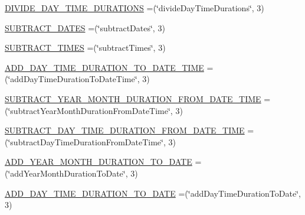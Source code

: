 \begin{DoxyCompactItemize}
\item 
\hyperlink{enumorg_1_1semanticweb_1_1owlapi_1_1vocab_1_1_s_w_r_l_built_ins_vocabulary_a63a05090a4989d42fb0eba21886a5f09}{D\-I\-V\-I\-D\-E\-\_\-\-D\-A\-Y\-\_\-\-T\-I\-M\-E\-\_\-\-D\-U\-R\-A\-T\-I\-O\-N\-S} =(\char`\"{}divide\-Day\-Time\-Durations\char`\"{}, 3)
\item 
\hyperlink{enumorg_1_1semanticweb_1_1owlapi_1_1vocab_1_1_s_w_r_l_built_ins_vocabulary_a159b1927f00998bffdca289368b8badb}{S\-U\-B\-T\-R\-A\-C\-T\-\_\-\-D\-A\-T\-E\-S} =(\char`\"{}subtract\-Dates\char`\"{}, 3)
\item 
\hyperlink{enumorg_1_1semanticweb_1_1owlapi_1_1vocab_1_1_s_w_r_l_built_ins_vocabulary_af9557d553614c0a341302fb24b919940}{S\-U\-B\-T\-R\-A\-C\-T\-\_\-\-T\-I\-M\-E\-S} =(\char`\"{}subtract\-Times\char`\"{}, 3)
\item 
\hyperlink{enumorg_1_1semanticweb_1_1owlapi_1_1vocab_1_1_s_w_r_l_built_ins_vocabulary_aadaba5763b67be920279af883fc61c6f}{A\-D\-D\-\_\-\-D\-A\-Y\-\_\-\-T\-I\-M\-E\-\_\-\-D\-U\-R\-A\-T\-I\-O\-N\-\_\-\-T\-O\-\_\-\-D\-A\-T\-E\-\_\-\-T\-I\-M\-E} =(\char`\"{}add\-Day\-Time\-Duration\-To\-Date\-Time\char`\"{}, 3)
\item 
\hyperlink{enumorg_1_1semanticweb_1_1owlapi_1_1vocab_1_1_s_w_r_l_built_ins_vocabulary_ad3705680ff4cd9d4794585307169d092}{S\-U\-B\-T\-R\-A\-C\-T\-\_\-\-Y\-E\-A\-R\-\_\-\-M\-O\-N\-T\-H\-\_\-\-D\-U\-R\-A\-T\-I\-O\-N\-\_\-\-F\-R\-O\-M\-\_\-\-D\-A\-T\-E\-\_\-\-T\-I\-M\-E} =(\char`\"{}subtract\-Year\-Month\-Duration\-From\-Date\-Time\char`\"{}, 3)
\item 
\hyperlink{enumorg_1_1semanticweb_1_1owlapi_1_1vocab_1_1_s_w_r_l_built_ins_vocabulary_a882bdfdd77a252f5636e6777ae091876}{S\-U\-B\-T\-R\-A\-C\-T\-\_\-\-D\-A\-Y\-\_\-\-T\-I\-M\-E\-\_\-\-D\-U\-R\-A\-T\-I\-O\-N\-\_\-\-F\-R\-O\-M\-\_\-\-D\-A\-T\-E\-\_\-\-T\-I\-M\-E} =(\char`\"{}subtract\-Day\-Time\-Duration\-From\-Date\-Time\char`\"{}, 3)
\item 
\hyperlink{enumorg_1_1semanticweb_1_1owlapi_1_1vocab_1_1_s_w_r_l_built_ins_vocabulary_a270cdc44b1eaed39a61b7a0a03f6c1b5}{A\-D\-D\-\_\-\-Y\-E\-A\-R\-\_\-\-M\-O\-N\-T\-H\-\_\-\-D\-U\-R\-A\-T\-I\-O\-N\-\_\-\-T\-O\-\_\-\-D\-A\-T\-E} =(\char`\"{}add\-Year\-Month\-Duration\-To\-Date\char`\"{}, 3)
\item 
\hyperlink{enumorg_1_1semanticweb_1_1owlapi_1_1vocab_1_1_s_w_r_l_built_ins_vocabulary_add45d30d373131942d4cbebd14e7bd3b}{A\-D\-D\-\_\-\-D\-A\-Y\-\_\-\-T\-I\-M\-E\-\_\-\-D\-U\-R\-A\-T\-I\-O\-N\-\_\-\-T\-O\-\_\-\-D\-A\-T\-E} =(\char`\"{}add\-Day\-Time\-Duration\-To\-Date\char`\"{}, 3)

\end{DoxyCompactItemize}
